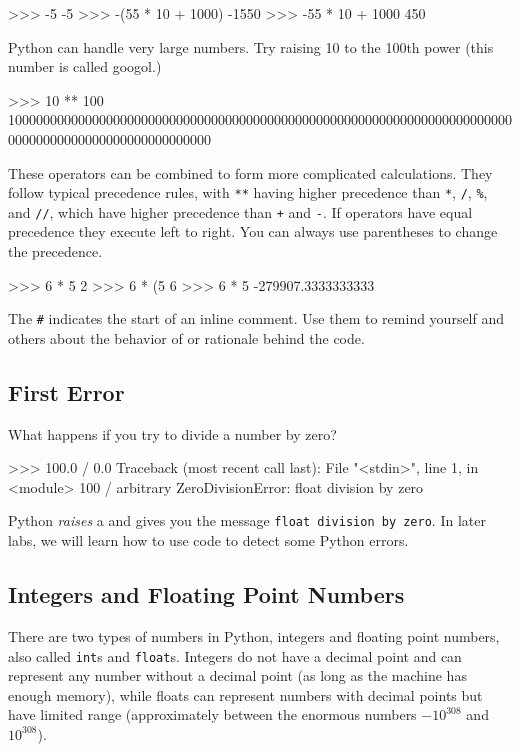 \documentclass[11pt]{cselabheader}
\begin{document}
\begin{pyconcode}
>>> -5
-5
>>> -(55 * 10 + 1000)
-1550
>>> -55 * 10 + 1000
450

\end{pyconcode}

Python can handle very large numbers. Try raising 10 to the 100th power
(this number is called googol.)

\begin{pyconcode}
>>> 10 ** 100
10000000000000000000000000000000000000000000000000000000000000000000000000000000000000000000000000000

\end{pyconcode}

These operators can be combined to form more complicated
calculations. They follow typical precedence rules, with \texttt{**}
having higher precedence than \texttt{*}, \texttt{/}, \texttt{\%}, and
\texttt{//}, which have higher precedence than \texttt{+} and
\texttt{-}. If operators have equal precedence they execute left to
right. You can always use parentheses to change the precedence.

\begin{pyconcode}
>>> 6 * 5 %
2
>>> 6 * (5 %
6
>>> 6 * 5 %
-279907.3333333333

\end{pyconcode}

The \texttt{\#} indicates the start of an inline comment.  Use them to remind yourself and others about the behavior
of or rationale behind the code.

\subsection{First Error}

What happens if you try to divide a number by zero?

\begin{pyconcode}
>>> 100.0 / 0.0
Traceback (most recent call last):
  File "<stdin>", line 1, in <module>
    100 / arbitrary
ZeroDivisionError: float division by zero

\end{pyconcode}

Python \textsl{raises} a  and gives
you the message \texttt{float division by zero}. In later labs, we
will learn how to use code to detect some Python errors.

\subsection{Integers and Floating Point Numbers}
There are two types of numbers in Python, integers and floating point numbers, also
called \texttt{int}s and \texttt{float}s.  Integers do not have a
decimal point and can represent any number without a decimal point
(as long as the machine has enough memory),
while floats can represent numbers with decimal points but have
limited range (approximately between the enormous numbers $-10^{308}$
and $10^{308}$).
\end{document}
